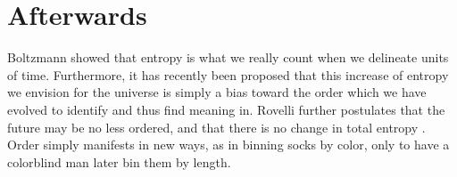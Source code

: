 
% 
\graphicspath{{6/figures/}} %



\chapter{\label{}Afterwards}


Boltzmann showed that entropy is what we really count when we delineate units of time. Furthermore, it has recently been proposed \citep{connes1994neumann} that this increase of entropy we envision for the universe is simply a bias toward the order which we have evolved to identify and thus find meaning in. Rovelli further postulates that the future may be no less ordered, and that there is no change in total entropy \citep{rovelli}. Order simply manifests in new ways, as in binning socks by color, only to have a colorblind man later bin them by length.

